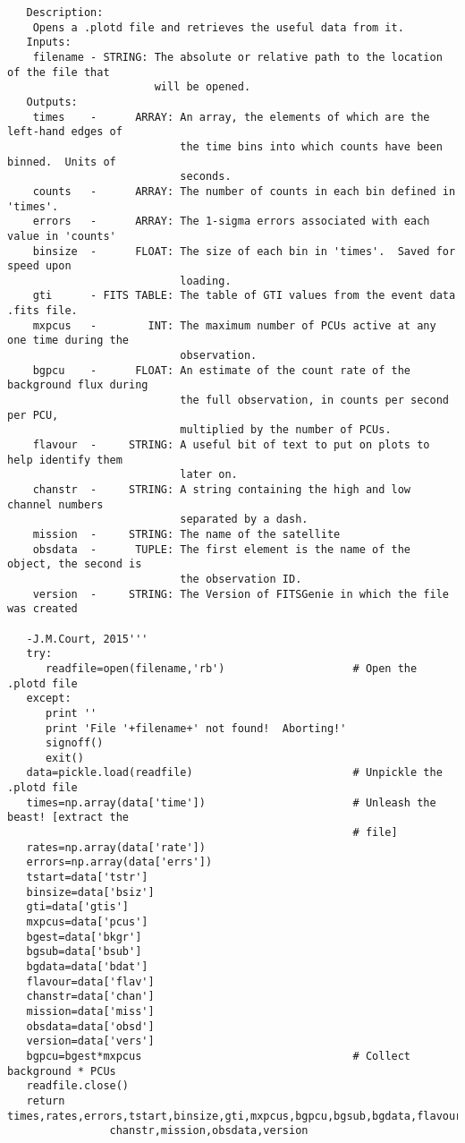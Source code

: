 \begin{verbatim}
   Description:
    Opens a .plotd file and retrieves the useful data from it.
   Inputs:
    filename - STRING: The absolute or relative path to the location of the file that
                       will be opened.
   Outputs:
    times    -      ARRAY: An array, the elements of which are the left-hand edges of
                           the time bins into which counts have been binned.  Units of
                           seconds.
    counts   -      ARRAY: The number of counts in each bin defined in 'times'.
    errors   -      ARRAY: The 1-sigma errors associated with each value in 'counts'
    binsize  -      FLOAT: The size of each bin in 'times'.  Saved for speed upon
                           loading.
    gti      - FITS TABLE: The table of GTI values from the event data .fits file.
    mxpcus   -        INT: The maximum number of PCUs active at any one time during the
                           observation.
    bgpcu    -      FLOAT: An estimate of the count rate of the background flux during
                           the full observation, in counts per second per PCU,
                           multiplied by the number of PCUs.
    flavour  -     STRING: A useful bit of text to put on plots to help identify them
                           later on.
    chanstr  -     STRING: A string containing the high and low channel numbers
                           separated by a dash.
    mission  -     STRING: The name of the satellite
    obsdata  -      TUPLE: The first element is the name of the object, the second is
                           the observation ID.
    version  -     STRING: The Version of FITSGenie in which the file was created

   -J.M.Court, 2015'''
   try:
      readfile=open(filename,'rb')                    # Open the .plotd file
   except:
      print ''
      print 'File '+filename+' not found!  Aborting!'
      signoff()
      exit()
   data=pickle.load(readfile)                         # Unpickle the .plotd file
   times=np.array(data['time'])                       # Unleash the beast! [extract the
                                                      # file]
   rates=np.array(data['rate'])
   errors=np.array(data['errs'])
   tstart=data['tstr']
   binsize=data['bsiz']
   gti=data['gtis']
   mxpcus=data['pcus']
   bgest=data['bkgr']
   bgsub=data['bsub']
   bgdata=data['bdat']
   flavour=data['flav']
   chanstr=data['chan']
   mission=data['miss']
   obsdata=data['obsd']
   version=data['vers']
   bgpcu=bgest*mxpcus                                 # Collect background * PCUs
   readfile.close()
   return times,rates,errors,tstart,binsize,gti,mxpcus,bgpcu,bgsub,bgdata,flavour,
                chanstr,mission,obsdata,version


\end{verbatim}
